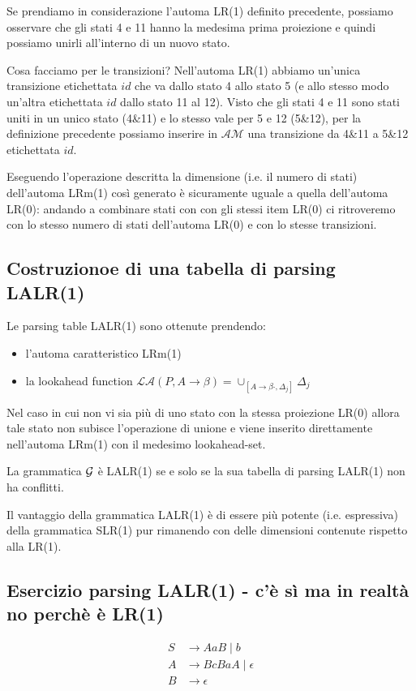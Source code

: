 \documentclass[class=book, crop=false, oneside, 12pt]{standalone}
\begin{document}
Se prendiamo in considerazione l'automa LR(1) definito precedente, possiamo osservare che gli stati 4 e 11 hanno la medesima prima proiezione e quindi possiamo unirli all'interno di un nuovo stato.

Cosa facciamo per le transizioni? Nell'automa LR(1) abbiamo un'unica transizione etichettata \(id\) che va dallo stato 4 allo stato 5 (e allo stesso modo un'altra etichettata \(id\) dallo stato 11 al 12). Visto che gli stati 4 e 11 sono stati uniti in un unico stato (4\&11) e lo stesso vale per 5 e 12 (5\&12), per la definizione precedente possiamo inserire in \(\mathcal{AM}\) una transizione da 4\&11 a 5\&12 etichettata \(id\).

Eseguendo l'operazione descritta la dimensione (i.e. il numero di stati) dell'automa LRm(1) così generato è sicuramente uguale a quella dell'automa LR(0): andando a combinare stati con con gli stessi item LR(0) ci ritroveremo con lo stesso numero di stati dell'automa LR(0) e con lo stesse transizioni. 

\subsection{Costruzionoe di una tabella di parsing LALR(1)}

Le parsing table LALR(1) sono ottenute prendendo:

\begin{itemize}
    \item l'automa caratteristico LRm(1)
    \item la lookahead function \(\mathcal{LA}(P, A \to \beta) = \cup_{[A \to \beta \cdot, \Delta_j]} \Delta_j\)
\end{itemize}

Nel caso in cui non vi sia più di uno stato con la stessa proiezione LR(0) allora tale stato non subisce l'operazione di unione e viene inserito direttamente nell'automa LRm(1) con il medesimo lookahead-set.

La grammatica \(\mathcal{G}\) è LALR(1) se e solo se la sua tabella di parsing LALR(1) non ha conflitti. 

Il vantaggio della grammatica LALR(1) è di essere più potente (i.e. espressiva) della grammatica SLR(1) pur rimanendo con delle dimensioni contenute rispetto alla LR(1). 

\subsection*{Esercizio parsing LALR(1) - c'è sì ma in realtà no perchè è LR(1)}
\begin{align*}
    S &\to AaB \mid b \\
    A &\to BcBaA \mid \epsilon \\
    B &\to \epsilon
\end{align*}
\end{document}
